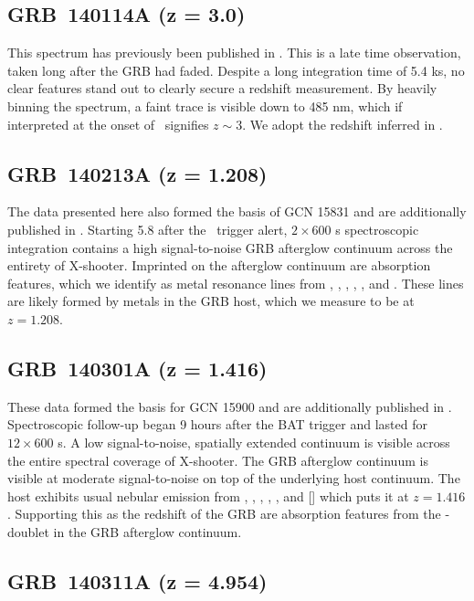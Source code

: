 \documentclass[longauth]{aa}    %
\begin{document}
\subsection{GRB~140114A (z = 3.0)}	\label{140114}

This spectrum has previously been published in \citet{Kruhler2015}. This is a
late time observation, taken long after the GRB had faded. Despite a long
integration time of 5.4 ks, no clear features stand out to clearly secure a
redshift measurement. By heavily binning the spectrum, a faint trace is visible
down to 485 nm, which if interpreted at the onset of \lya~signifies $z \sim
3$. We adopt the redshift inferred in \citet{Kruhler2015}.

\subsection{GRB~140213A (z = 1.208)}\label{140213}

The data presented here also formed the basis of GCN 15831 \citep{GCN15831} and
are additionally published in \citet{Kruhler2015}. Starting 5.8 after the
\swift~trigger alert, $2\times600$ s spectroscopic integration contains a high
signal-to-noise GRB afterglow continuum across the entirety of X-shooter.
Imprinted on the afterglow continuum are absorption features, which we identify
as metal resonance lines from \civ, \alii, \aliii, \feii, \mgii, and \mgi. These
lines are likely formed by metals in the GRB host, which we measure to be at $z
= 1.208$.

\subsection{GRB~140301A (z = 1.416)}\label{140301}

These data formed the basis for GCN 15900 \citep{GCN15900} and are additionally
published in \citet{Kruhler2015}. Spectroscopic follow-up began 9 hours after
the BAT trigger and lasted for $12\times600$ s. A low signal-to-noise, spatially
extended continuum is visible across the entire spectral coverage of X-shooter.
The GRB afterglow continuum is visible at moderate signal-to-noise on top of the
underlying host continuum. The host exhibits usual nebular emission from \oii,
\hb, \oiii, \ha, \nii, and [\sii] which puts it at $z = 1.416$. Supporting this as
the redshift of the GRB are absorption features from the \mgii-doublet in the
GRB afterglow continuum.

\subsection{GRB~140311A (z = 4.954)}	
\label{140311}
\end{document}
